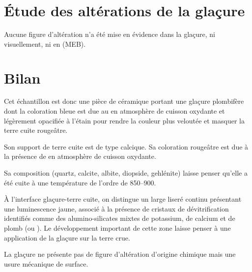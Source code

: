 \section{Étude des altérations de la glaçure}

Aucune figure d'altération n'a été mise en évidence dans la glaçure, 
ni visuellement, ni en \MEB[ie] (MEB).


\section{Bilan}

Cet échantillon est donc une pièce de céramique portant une glaçure 
plombifère dont la coloration bleue est due au  en 
atmosphère de cuisson oxydante et légèrement opacifiée à l'étain pour 
rendre la couleur plus veloutée et masquer la terre cuite rougeâtre.

Son support de terre cuite est de type calcique. Sa coloration 
rougeâtre est due à la présence de  en atmosphère de 
cuisson oxydante.

Sa composition \cristallo (quartz, calcite, albite, diopside, 
gehlénite) laisse penser qu'elle a été cuite à une température 
de l'ordre de \SIrange[range-phrase=\ à\ ]{850}{900}{\degC}.

À l'interface glaçure-terre cuite, on distingue un large liseré 
continu présentant une luminescence jaune, associé à la présence de 
cristaux de dévitrification identifiés comme des alumino-silicates 
mixtes de potassium, de calcium et de plomb (ou ). Le développement important de cette zone laisse penser à
une application de la glaçure sur la terre crue.

La glaçure ne présente pas de figure d'altération d'origine chimique 
mais une usure mécanique de surface.
